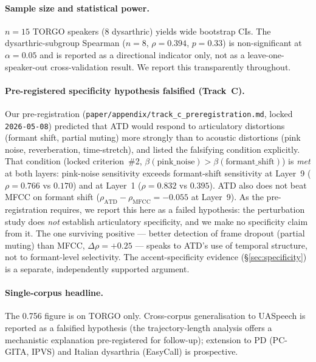 
\paragraph{Sample size and statistical power.}
$n = 15$ TORGO speakers (8 dysarthric) yields wide bootstrap CIs. The
dysarthric-subgroup Spearman ($n = 8$, $\rho = 0.394$, $p = 0.33$) is
non-significant at $\alpha = 0.05$ and is reported as a directional
indicator only, not as a leave-one-speaker-out cross-validation result.
We report this transparently throughout.

\paragraph{Pre-registered specificity hypothesis falsified (Track~C).}
Our pre-registration (\texttt{paper/appendix/track\_c\_preregistration.md},
locked \texttt{2026-05-08}) predicted that ATD would respond to
articulatory distortions (formant shift, partial muting) more strongly
than to acoustic distortions (pink noise, reverberation, time-stretch),
and listed the falsifying condition explicitly. That condition (locked
criterion~\#2, $\beta(\text{pink\_noise}) > \beta(\text{formant\_shift})$)
is \emph{met} at both layers: pink-noise sensitivity exceeds formant-shift
sensitivity at Layer~9 ($\rho = 0.766$ vs $0.170$) and at Layer~1
($\rho = 0.832$ vs $0.395$). ATD also does not beat MFCC on formant shift
($\rho_{\text{ATD}} - \rho_{\text{MFCC}} = -0.055$ at Layer~9). As the
pre-registration requires, we report this here as a failed hypothesis: the
perturbation study does \emph{not} establish articulatory specificity, and
we make no specificity claim from it. The one surviving positive ---
better detection of frame dropout (partial muting) than MFCC,
$\Delta\rho = +0.25$ --- speaks to ATD's use of temporal structure, not to
formant-level selectivity. The accent-specificity evidence
(\S\ref{sec:specificity}) is a separate, independently supported argument.

\paragraph{Single-corpus headline.}
The 0.756 figure is on TORGO only. Cross-corpus generalisation to
UASpeech is reported as a falsified hypothesis (the trajectory-length
analysis offers a mechanistic explanation pre-registered for follow-up);
extension to PD (PC-GITA, IPVS) and Italian dysarthria (EasyCall) is
prospective.

